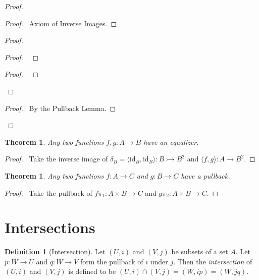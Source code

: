 \documentclass{book}
\let\qed\relax
\newtheorem{thm}[ax]{Theorem}
\theoremstyle{definition}
\newtheorem{df}[ax]{Definition}
\newcommand{\id}[1]{\ensuremath{\mathrm{id}_{#1}}}
\begin{document}
\begin{proof}
\pf
{}
\begin{proof}
	\pf\ Axiom of Inverse Images.
\end{proof}
\begin{proof}
	\begin{proof}
		\pf\ 
	\end{proof}
	\qedstep
	\begin{proof}
		\pf\ 
	\end{proof}
\end{proof}
\begin{proof}
	\pf\ By the Pullback Lemma.
\end{proof}
\qed
\end{proof}

\begin{thm}
Any two functions $f,g : A \rightarrow B$ have an equalizer.
\end{thm}

\begin{proof}
\pf\ Take the inverse image of $\delta_B = \langle \id{B}, \id{B} \rangle : B \rightarrowtail B^2$ and $\langle f,g \rangle : A \rightarrow B^2$. \qed
\end{proof}

\begin{thm}
Any two functions $f : A \rightarrow C$ and $g : B \rightarrow C$ have a pullback.
\end{thm}

\begin{proof}
\pf\ Take the pullback of $f \pi_1 : A \times B \rightarrow C$ and $g \pi_2 : A \times B \rightarrow C$. \qed
\end{proof}

\section{Intersections}

\begin{df}[Intersection]
Let $(U,i)$ and $(V,j)$ be subsets of a set $A$. 
Let $p : W \rightarrow U$ and $q : W \rightarrow V$ form the pullback of $i$ under $j$. Then
the \emph{intersection} of $(U,i)$ and $(V,j)$ is defined to be $(U,i) \cap (V,j) = (W, ip) = (W, jq)$.
\end{df}
\end{document}
